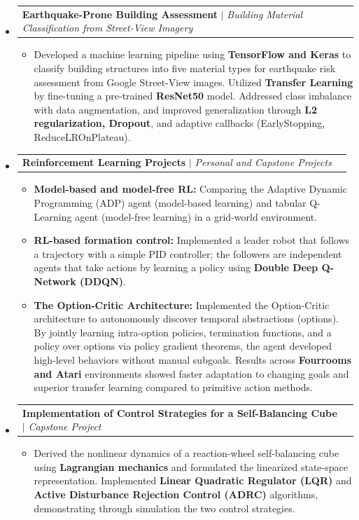 \documentclass[a4paper,10pt]{article}
\makeatletter
\newcommand{\resumeProjectHeading}[2]{
	\vspace{5pt}\item
	\begin{tabular*}{0.99\textwidth}{l@{\extracolsep{\fill}}r}
		\small#1 & \small#2 \\
	\end{tabular*}\vspace{3pt}
}
\newcommand{\resumeItemDesc}[1]{
	\begin{itemize}[leftmargin=0.32in, label={}, topsep=0pt, partopsep=0pt]
		\item \small{#1}
	\end{itemize}
	\vspace{1pt}
}
\makeatother
\begin{document}
\begin{itemize}[leftmargin=0.15in, label={}]
		\resumeProjectHeading
		{\textbf{Earthquake-Prone Building Assessment} $|$ \emph{Building Material Classification from Street-View Imagery}}{}
		\vspace{-6pt}
		\resumeItemDesc{Developed a machine learning pipeline using \textbf{TensorFlow and Keras} to classify building structures into five material types for earthquake risk assessment from Google Street-View images. Utilized \textbf{Transfer Learning} by fine-tuning a pre-trained \textbf{ResNet50} model. Addressed class imbalance with data augmentation, and improved generalization through \textbf{L2 regularization, Dropout}, and adaptive callbacks (EarlyStopping, ReduceLROnPlateau).}
		
		\resumeProjectHeading
		{\textbf{Reinforcement Learning Projects} $|$ \emph{Personal and Capstone Projects}}{}
		\begin{itemize}
			\item \small \textbf{Model-based and model-free RL:} Comparing the Adaptive Dynamic Programming (ADP) agent (model-based learning) and tabular Q-Learning agent (model-free learning) in a grid-world environment.
			\item \small \textbf{RL-based formation control:} Implemented a leader robot that follows a trajectory with a simple PID controller; the followers are independent agents that take actions by learning a policy using \textbf{Double Deep Q-Network (DDQN)}.
			\item \small \textbf{The Option-Critic Architecture:} Implemented the Option-Critic architecture to autonomously discover temporal abstractions (options). By jointly learning intra-option policies, termination functions, and a policy over options via policy gradient theorems, the agent developed high-level behaviors without manual subgoals. Results across \textbf{Fourrooms and Atari} environments showed faster adaptation to changing goals and superior transfer learning compared to primitive action methods.
		\end{itemize}
		\vspace{1pt}
		
		\resumeProjectHeading
		{\textbf{Implementation of Control Strategies for a Self-Balancing Cube} $|$ \emph{Capstone Project}}{}
		\vspace{-6pt}
		\resumeItemDesc{Derived the nonlinear dynamics of a reaction-wheel self-balancing cube using \textbf{Lagrangian mechanics} and formulated the linearized state-space representation. Implemented \textbf{Linear Quadratic Regulator (LQR)} and \textbf{Active Disturbance Rejection Control (ADRC)} algorithms, demonstrating through simulation the two control strategies.}
		

\end{itemize}
\end{document}
